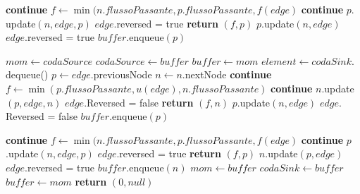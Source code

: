 \documentclass{article}
\begin{document}
\begin{algorithm}
    \begin{algorithmic}[1]
        \STATE \textbf{continue}
        \ELSE
        \STATE $f \leftarrow \min(n.flussoPassante,p.flussoPassante,f(edge)$
        \STATE \textbf{continue}
        \ENDIF
        \STATE $p.$update$(n,edge,p)$
        \STATE $edge.$reversed = true
        \STATE \textbf{return} $(f,p)$
        \ENDIF
        \ENDIF
        \STATE $p.$update$(n,edge)$
        \STATE $edge.$reversed = true
        \STATE $buffer.$enqueue$(p)$
        \ENDIF

        \ENDFOR
        \ENDWHILE
        \STATE $mom \leftarrow codaSource$
        \STATE $codaSource \leftarrow buffer$
        \STATE $buffer \leftarrow mom$
        \STATE $element \leftarrow codaSink.$dequeue()
        \STATE $p \leftarrow edge$.previousNode
        \STATE $n \leftarrow n.$nextNode
        \STATE \textbf{continue}
        \ELSE
        \STATE $f \leftarrow \min(p.flussoPassante,u(edge),n.flussoPassante)$
        \STATE \textbf{continue}
        \ENDIF
        \STATE $n.$update$(p,edge,n)$
        \STATE $edge.$Reversed = false
        \STATE \textbf{return} $(f,n)$
        \ENDIF
        \ENDIF
        \STATE $p.$update$(n,edge)$
        \STATE $edge.$Reversed = false
        \STATE $buffer.$enqueue$(p)$
        \ENDIF
    \end{algorithmic}
\end{algorithm}
\newpage
\begin{algorithm}
    \begin{algorithmic}[1]
        \STATE \textbf{continue}
        \ELSE
        \STATE $f \leftarrow \min(n.flussoPassante,p.flussoPassante,f(edge)$
        \STATE \textbf{continue}
        \ENDIF
        \STATE $p$.update$(n,edge,p)$
        \STATE $edge$.reversed = true
        \STATE \textbf{return} $(f,p)$
        \ENDIF
        \ENDIF
        \STATE $n.$update$(p,edge)$
        \STATE $edge$.reversed = true
        \STATE $buffer.$enqueue$(n)$
        \ENDIF
        \ENDFOR
        \ENDWHILE
        \STATE $mom \leftarrow buffer$
        \STATE $codaSink \leftarrow buffer$
        \STATE $buffer \leftarrow mom$
        \ENDWHILE
        \STATE \textbf{return} $(0,null)$
    \end{algorithmic}
\end{algorithm}
\end{document}
